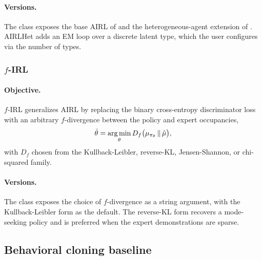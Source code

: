 \begin{algorithm}[H]
\SetAlgoLined
{}
\KwOut{$\hat\theta$, $\hat\omega$}
\caption{Adversarial IRL}
\end{algorithm}

\paragraph{Versions.} The  class exposes the base AIRL of \citet{fu2018} and the heterogeneous-agent extension  of \citet{lee2026airlhet}. AIRLHet adds an EM loop over a discrete latent type, which the user configures via the number of types.

\subsubsection{$f$-IRL}

\paragraph{Objective.} $f$-IRL \citep{ni2021firl} generalizes AIRL by replacing the binary cross-entropy discriminator loss with an arbitrary $f$-divergence between the policy and expert occupancies,
\begin{equation}
\hat\theta = \operatorname*{arg\,min}_\theta D_f \big( \mu_{\pi_\theta} \,\|\, \hat\mu \big),
\label{eq:firl}
\end{equation}
with $D_f$ chosen from the Kullback-Leibler, reverse-KL, Jensen-Shannon, or chi-squared family.

\paragraph{Versions.} The  class exposes the choice of $f$-divergence as a string argument, with the Kullback-Leibler form as the default. The reverse-KL form recovers a mode-seeking policy and is preferred when the expert demonstrations are sparse.

\subsection{Behavioral cloning baseline}

